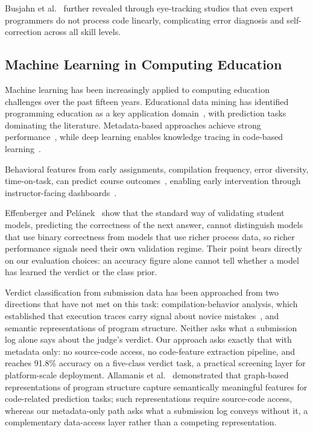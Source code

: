 \documentclass[acmsmall]{acmart}
\begin{document}
Busjahn et al.~\cite{busjahn2015eye} further revealed through eye-tracking studies that even expert programmers do not process code linearly, complicating error diagnosis and self-correction across all skill levels. 

\subsection{Machine Learning in Computing Education}

Machine learning has been increasingly applied to computing education
challenges over the past fifteen years. Educational data mining has identified programming education as a key application domain~\cite{romero2013data,baker2009educational}, with prediction tasks dominating the literature. Metadata-based approaches achieve strong performance~\cite{jadud2006methods,altadmri2015most}, while deep learning enables knowledge tracing in code-based learning~\cite{piech2015deep}.

Behavioral features from early assignments, compilation frequency, error diversity, time-on-task, can predict course outcomes~\cite{jadud2006methods,brown2014blackbox}, enabling early intervention through instructor-facing dashboards~\cite{jayaprakash2014early,verbert2013learning}.

Effenberger and Pel\'{a}nek~\cite{effenberger2021validity} show that the standard
way of validating student models, predicting the correctness of the next
answer, cannot distinguish models that use binary correctness from models that
use richer process data, so richer performance signals need their own validation
regime. Their point bears directly on our evaluation choices: an accuracy figure
alone cannot tell whether a model has learned the verdict or the class prior.

Verdict classification from submission data has been approached from two
directions that have not met on this task: compilation-behavior analysis,
which established that execution traces carry signal about novice
mistakes~\cite{jadud2006methods,altadmri2015most}, and semantic
representations of program structure. Neither asks what a submission log
alone says about the judge's verdict. Our approach asks exactly that with
metadata only: no source-code access, no code-feature extraction
pipeline, and reaches 91.8\% accuracy on a five-class verdict task, a
practical screening layer for platform-scale deployment. Allamanis et al.~\cite{allamanis2018learning} demonstrated that
graph-based representations of program structure capture semantically
meaningful features for code-related prediction tasks; such representations
require source-code access, whereas our metadata-only path asks what a
submission log conveys without it, a complementary data-access layer rather
than a competing representation.
\end{document}
